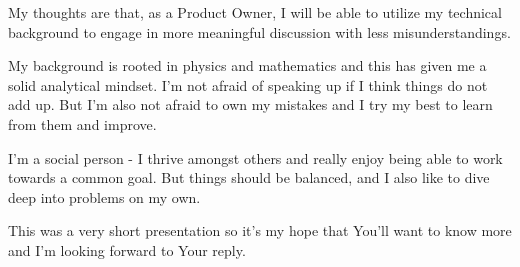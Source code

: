 \documentclass[11pt, a4paper]{awesome-cv} %
\begin{document}
\begin{cvletter}
My thoughts are that, as a Product Owner, I will be able to utilize my technical background to engage in more meaningful discussion with less misunderstandings.

My background is rooted in physics and mathematics and this has given me a solid analytical mindset. I'm not afraid of speaking up if I think things do not add up. But I'm also not afraid to own my mistakes and I try my best to learn from them and improve.

I'm a social person - I thrive amongst others and really enjoy being able to work towards a common goal. But things should be balanced, and I also like to dive deep into problems on my own.

This was a very short presentation so it's my hope that You'll want to know more and I'm looking forward to Your reply.
\end{cvletter}


\makeletterclosing %
\end{document}
